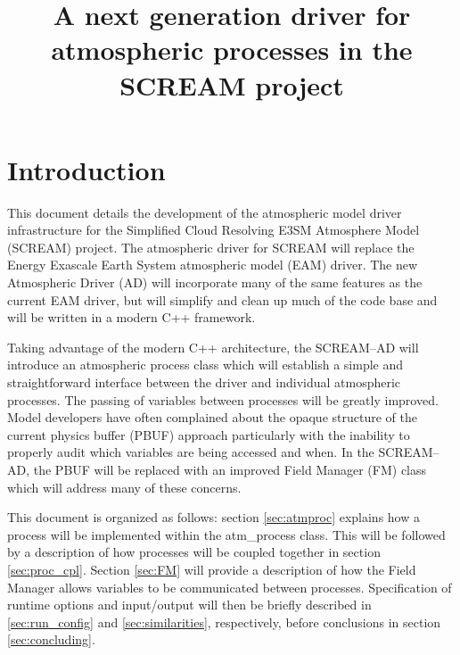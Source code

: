 \documentclass[10pt]{article}
\title{A next generation driver for atmospheric processes in the SCREAM project}
\begin{document}
\maketitle

\section{Introduction}

This document details the development of the atmospheric model driver infrastructure for the Simplified Cloud Resolving E3SM Atmosphere Model (SCREAM) project.  The atmospheric driver for SCREAM will replace the Energy Exascale Earth System atmospheric model (EAM) driver.  The new Atmospheric Driver (AD) will incorporate many of the same features as the current EAM driver, but will simplify and clean up much of the code base and will be written in a modern C++ framework.

Taking advantage of the modern C++ architecture, the SCREAM--AD will introduce an atmospheric process class which will establish a simple and straightforward interface between the driver and individual atmospheric processes.  The passing of variables between processes will be greatly improved.  Model developers have often complained about the opaque structure of the current physics buffer (PBUF) approach particularly with the inability to properly audit which variables are being accessed and when.  In the SCREAM--AD, the PBUF will be replaced with an improved Field Manager (FM) class which will address many of these concerns.

This document is organized as follows: section \ref{sec:atmproc} explains how a process will be implemented within the atm\_process class. This will be followed by a description of how processes will be coupled together in section \ref{sec:proc_cpl}. Section \ref{sec:FM} will provide a description of how the Field Manager allows variables to be communicated between processes. Specification of runtime options and input/output will then be briefly described in \ref{sec:run_config} and \ref{sec:similarities}, respectively, before conclusions in section \ref{sec:concluding}.

\end{document}
